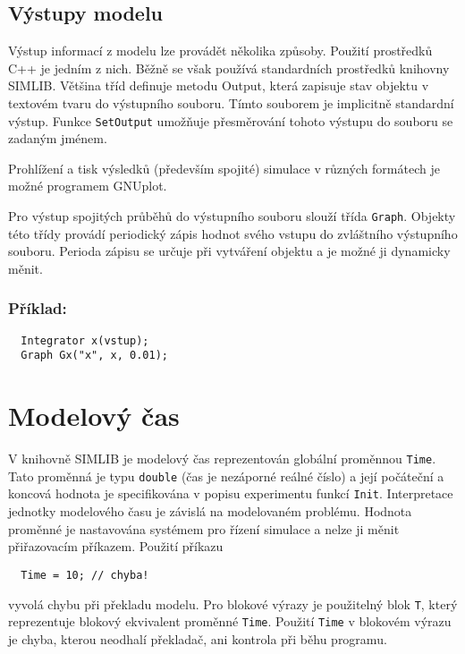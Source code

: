 \documentclass[a4paper]{article}
\begin{document}
\subsection{Výstupy modelu}

Výstup informací z modelu lze provádět několika způsoby. Použití
prostředků C++ je jedním z nich. Běžně se však používá
standardních prostředků knihovny SIMLIB. Většina tříd definuje
metodu Output, která zapisuje stav objektu v textovém tvaru do
výstupního souboru. Tímto souborem je implicitně standardní
výstup. Funkce \verb|SetOutput| umožňuje přesměrování
tohoto výstupu do souboru se zadaným jménem.

Prohlížení a tisk výsledků (především spojité) simulace  v různých formátech
je možné programem GNUplot.



Pro výstup spojitých průběhů do výstupního souboru slouží třída \verb|Graph|.
Objekty této třídy provádí periodický zápis hodnot svého vstupu do zvláštního
výstupního souboru. Perioda zápisu se určuje při vytváření objektu a je možné
ji dynamicky měnit.

\subsubsection*{Příklad:}

\begin{verbatim}
  Integrator x(vstup);
  Graph Gx("x", x, 0.01);
\end{verbatim}


\section{Modelový čas}

V knihovně SIMLIB je modelový čas reprezentován globální
proměnnou \verb|Time|. Tato proměnná je typu \verb|double| (čas je nezáporné
reálné číslo) a její počáteční a koncová hodnota je
specifikována v popisu experimentu funkcí \verb|Init|. Interpretace
jednotky modelového času je závislá na modelovaném problému.
Hodnota proměnné je nastavována systémem pro řízení
simulace a nelze ji měnit přiřazovacím příkazem. Použití příkazu

\begin{verbatim}
  Time = 10; // chyba!
\end{verbatim}

vyvolá chybu při překladu modelu. Pro blokové výrazy je použitelný blok
\verb|T|, který reprezentuje blokový ekvivalent proměnné \verb|Time|.
Použití \verb|Time| v blokovém výrazu je chyba, kterou neodhalí překladač,
ani kontrola při běhu programu.
\end{document}
